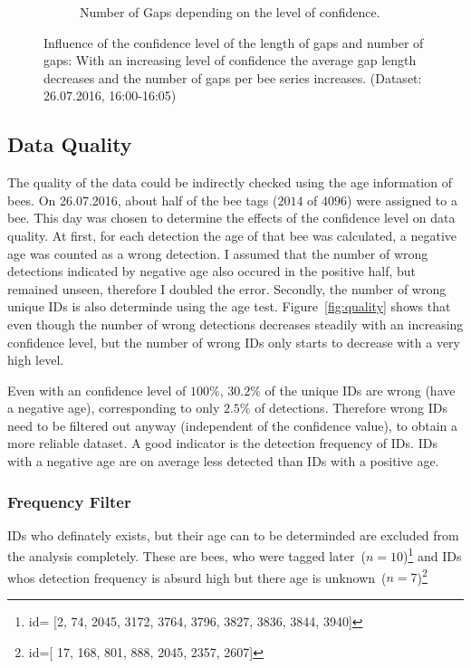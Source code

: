 \begin{figure}
\begin{subfigure}[b]{0.45\textwidth}
		\caption[Number of Gaps]{Number of Gaps depending on the level of confidence.}
		\label{fig:numgaps}
	\end{subfigure}
	\caption[Influence of Confidence Level on Gaps]{Influence of the confidence level of the length of gaps and number of gaps: With an increasing level of confidence the average gap length decreases and the number of gaps per bee series increases. (Dataset: 26.07.2016, 16:00-16:05)}
	\label{fig:gaps}
\end{figure}

\subsection{Data Quality}
\label{subsec:quality}

The quality of the data could be indirectly checked using the age information of bees. On 26.07.2016, about half of the bee tags ($2014$ of $4096$) were assigned to a bee. This day was chosen to determine the effects of the confidence level on data quality.
At first, for each detection the age of that bee was calculated, a negative age was counted as a wrong detection. I assumed that the number of wrong detections indicated by negative age also occured in the positive half, but remained unseen, therefore I doubled the error. Secondly, the number of wrong unique IDs is also determinde using the age test. Figure~\ref{fig:quality} shows that even though the number of wrong detections
decreases steadily with an increasing confidence level, but the number of wrong IDs only starts to decrease with a very high level.

Even with an confidence level of $100\%$, $30.2\%$ of the unique IDs are wrong (have a negative age), corresponding to only $2.5\%$ of detections. Therefore wrong IDs need to be filtered out anyway (independent of the confidence value), to obtain a more reliable dataset. A good indicator is the detection frequency of IDs. IDs with a negative age are on average less detected than IDs with a positive age.

\subsubsection{Frequency Filter}
IDs who definately exists, but their age can to be determinded are excluded from the analysis completely. These are bees, who were tagged later~($n=10$)\footnote{id= [2,
	74,
	2045,
	3172,
	3764,
	3796,
	3827,
	3836,
	3844,
	3940]} and IDs whos detection frequency is absurd high but there age is unknown~($n=7$)\footnote{id=[
	17,
	168,
	801,
	888,
	2045,
	2357,
	2607]}

